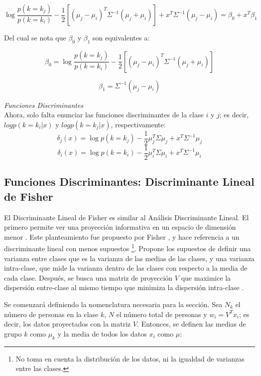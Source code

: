 $$ \log \frac{p(k = k_j)}{p(k = k_i)} - \frac{1}{2}[(\mu_j - \mu_i)^T \Sigma^{-1} (\mu_j + \mu_i)] + {x}^T \Sigma^{-1} (\mu_j - \mu_i) = \beta_0 +  x^T \beta_1$$

Del cual se nota que $\beta_0$ y $\beta_1$ son equivalentes a:

\begin{equation} \label{eq:13}
\beta_0 = \log \frac{p(k = k_j)}{p(k = k_i)} - \frac{1}{2}[(\mu_j - \mu_i)^T \Sigma^{-1} (\mu_j +\mu_i)] 	
\end{equation}

\begin{equation} \label{eq:14}
 \beta_1 = \Sigma^{-1} (\mu_j -\mu_i)
\end{equation}


\textit{Funciones Discriminantes} \\
Ahora, solo falta enunciar las funciones discriminantes de la clase $i$ y $j$; es decir, $log p(k = k_i | x)$ y  $log p(k = k_j | x)$, respectivamente:
$$ \delta_j (x) = \log {p(k = k_j)} - \frac{1}{2}\mu_j^T \Sigma \mu_j + x^T \Sigma^{-1} \mu_j$$
$$ \delta_i (x) = \log {p(k= k_i)} - \frac{1}{2}\mu_i^T \Sigma \mu_i + x^T \Sigma^{-1} \mu_i$$


\subsection{Funciones Discriminantes: Discriminante Lineal de Fisher}

El Discriminante Lineal de Fisher es similar al Análisis Discriminante Lineal. El primero permite ver una proyección informativa en un espacio de dimensión menor \cite{hastie2009elements}. Este planteamiento fue propuesto por Fisher \cite{fisher1936use}, y hace referencia a un discriminante lineal con menos supuestos \footnote{No toma en cuenta la distribución de los datos, ni la igualdad de varianzas entre las clases.}. Propone los supuestos de definir una varianza entre clases que es la varianza de las medias de las clases, y una varianza intra-clase, que mide la varianza dentro de las clases con respecto a la media de cada clase. Después, se busca una matriz de proyección $V$ que maximice la dispersión entre-clase al mismo tiempo que minimiza la dispersión intra-clase \cite{ngo2012trace}.

Se comenzará definiendo la nomenclatura necesaria para la sección. Sea $N_{k}$ el número de personas en la clase $k$, $N$ el número total de personas y $w_i = V^T x_i$; es decir, los datos proyectados con la matriz $V$. Entonces, se definen las medias de grupo $k$ como $\mu_k$ y la media de todos los datos $x_i$ como $\mu$:

